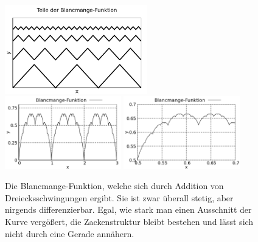 \begin{figure}[H]
    \centering
    \includegraphics[width=0.55\textwidth]{./gnuplot/blancmange-function-parts}
    \includegraphics[width=0.45\textwidth]{./gnuplot/blancmange-function-total}
    \includegraphics[width=0.45\textwidth]{./gnuplot/blancmange-function-zoomed}
    \caption{Die Blancmange-Funktion, welche sich durch Addition von Dreiecksschwingungen ergibt. Sie ist zwar überall stetig, aber nirgends differenzierbar. Egal, wie stark man einen Ausschnitt der Kurve vergößert, die Zackenstruktur bleibt bestehen und lässt sich nicht durch eine Gerade annähern.}
    \label{fig:BlancmangeFunction}
\end{figure}
